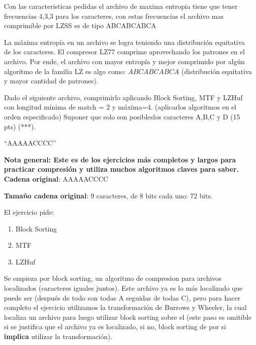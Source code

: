 \documentclass[a4paper]{article}
\newenvironment{enunciado}[3]{%
    \vspace{\baselineskip}
    \tcolorbox[beamer,%
    noparskip,breakable,
    colback=LightGreen,colframe=DarkGreen,%
    colbacklower=LimeGreen!75!LightGreen,%
    title=\small Enunciado: Año #1\, Cuatrimestre #2\, Oportunidad #3]}%
    {\endtcolorbox}
\newenvironment{criterio}[3]{%
    \tcolorbox[beamer,%
    noparskip,breakable,
    colback=LightCoral,colframe=DarkRed,%
    colbacklower=Tomato!75!LightCoral,%
    title=\small Criterio de Corrección: Año #1\, Cuatrimestre #2\, Oportunidad #3]}%
    {\endtcolorbox}
\begin{document}
    \begin{criterio}{2015}{2}{1}
        Con las caracteristicas pedidas el archivo de maxima entropia tiene que tener frecuencias 4,3,3 para los caracteres, con estas frecuencias el archivo mas comprimible por LZSS es de tipo ABCABCABCA
    \end{criterio}

    La máxima entropía en un archivo se logra teniendo una distribución equitativa de los caracteres. El compresor LZ77 comprime aprovechando los patrones en el archivo. Por ende, el archivo con mayor entropía y mejor comprimido por algún algoritmo de la familia LZ es algo como: $ABCABCABCA$ (distribución equitativa y mayor cantidad de patrones).

    \begin{enunciado}{2015}{2}{2}
        Dado el siguiente archivo, comprimirlo aplicando Block Sorting, MTF y LZHuf con longitud mínima de match = 2 y máxima=4. (aplicarlos algoritmos en el orden especificado) Suponer que solo son posibleslos caracteres A,B,C y  D (15 pts) (***).
        
        “AAAAACCCC”    
    \end{enunciado}

    \textbf{Nota general: Este es de los ejercicios más completos y largos para practicar compresión y utiliza muchos algoritmos claves para saber.} \\

	\textbf{Cadena original}: AAAAACCCC
	
    \textbf{Tamaño cadena original}: 9 caracteres, de 8 bits cada uno: 72 bits.
    
    El ejercicio pide:

    \begin{enumerate}
        \item Block Sorting
        \item MTF
        \item LZHuf
    \end{enumerate}   

    Se empieza por block sorting, un algoritmo de compresion para archivos localizados (caracteres iguales juntos). Este archivo ya es lo más localizado que puede ser (después de todo son todas A seguidas de todas C), pero para hacer completo el ejercicio utilizamos la transformación de Burrows y Wheeler, la cual localiza un archivo para luego utilizar block sorting sobre el (este paso es omitible si se justifica que el archivo ya es localizado, si no, block sorting de por si \textbf{implica} utilizar la transformación).
\end{document}
